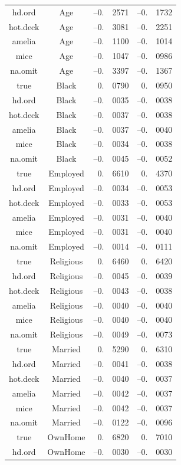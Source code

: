 \documentclass[12pt,econ]{sources/authesis}
\begin{document}
\begin{longtable}{ccr@{}lr@{}l}
 hd.ord & Age & --0.&2571 & --0.&1732 \\ 
 hot.deck & Age & --0.&3081 & --0.&2251 \\
 amelia & Age & --0.&1100 & --0.&1014 \\ 
 mice & Age & --0.&1047 & --0.&0986 \\ 
 na.omit & Age & --0.&3397 & --0.&1367 \\
 true & Black & 0.&0790 & 0.&0950 \\
 hd.ord & Black & --0.&0035 & --0.&0038 \\
 hot.deck & Black & --0.&0037 & --0.&0038 \\ 
 amelia & Black & --0.&0037 & --0.&0040 \\ 
 mice & Black & --0.&0034 & --0.&0038 \\
 na.omit & Black & --0.&0045 & --0.&0052 \\
 true & Employed & 0.&6610 & 0.&4370 \\
 hd.ord & Employed & --0.&0034 & --0.&0053 \\
 hot.deck & Employed & --0.&0033 & --0.&0053 \\
 amelia & Employed & --0.&0031 & --0.&0040 \\
 mice & Employed & --0.&0031 & --0.&0040 \\ 
 na.omit & Employed & --0.&0014 & --0.&0111 \\ 
 true & Religious & 0.&6460 & 0.&6420 \\ 
 hd.ord & Religious & --0.&0045 & --0.&0039 \\
 hot.deck & Religious & --0.&0043 & --0.&0038 \\
 amelia & Religious & --0.&0040 & --0.&0040 \\
 mice & Religious & --0.&0040 & --0.&0040 \\ 
 na.omit & Religious & --0.&0049 & --0.&0073 \\ 
 true & Married & 0.&5290 & 0.&6310 \\ 
 hd.ord & Married & --0.&0041 & --0.&0038 \\
 hot.deck & Married & --0.&0040 & --0.&0037 \\ 
 amelia & Married & --0.&0042 & --0.&0037 \\ 
 mice & Married & --0.&0042 & --0.&0037 \\ 
 na.omit & Married & --0.&0122 & --0.&0096 \\ 
 true & OwnHome & 0.&6820 & 0.&7010 \\ 
 hd.ord & OwnHome & --0.&0030 & --0.&0030 \\ 

\end{longtable}
\end{document}
